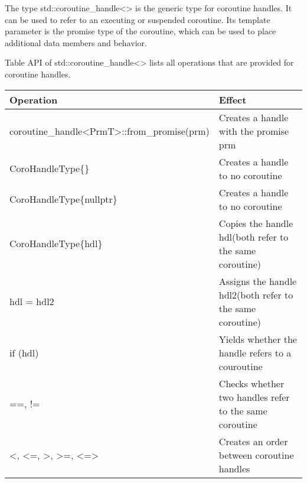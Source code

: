 
The type std::coroutine\_handle<> is the generic type for coroutine handles. It can be used to refer to an executing or suspended coroutine. Its template parameter is the promise type of the coroutine, which can be used to place additional data members and behavior.

Table API of std::coroutine\_handle<> lists all operations that are provided for coroutine handles.

\begin{longtable}[c]{|l|l|}
\hline
\textbf{Operation}                                                                     & \textbf{Effect}                                                                        \\ \hline
\endfirsthead
%
\endhead
%
coroutine\_handle\textless{}PrmT\textgreater{}::from\_promise(prm)                     & Creates a handle with the promise prm                                                  \\ \hline
CoroHandleType\{\}                                                                     & Creates a handle to no coroutine                                                       \\ \hline
CoroHandleType\{nullptr\}                                                              & Creates a handle to no coroutine                                                       \\ \hline
CoroHandleType\{hdl\}                                                                  & Copies the handle hdl(both refer to the same coroutine)                                \\ \hline
hdl = hdl2                                                                             & Assigns the handle hdl2(both refer to the same coroutine)                              \\ \hline
if (hdl)                                                                               & Yields whether the handle refers to a couroutine                                       \\ \hline
==, !=                                                                                 & Checks whether two handles refer to the same coroutine                                 \\ \hline
\textless{}, \textless{}=, \textgreater{}, \textgreater{}=, \textless{}=\textgreater{} & Creates an order between coroutine handles                                             \\ \hline

\end{longtable}
